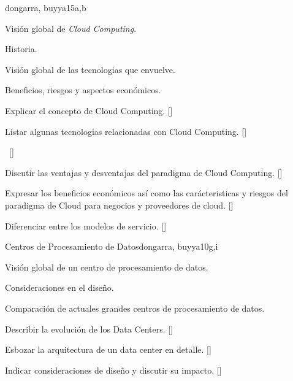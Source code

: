 \begin{syllabus}
\begin{unit}{\PDCloudComputing}{}{dongarra, buyya}{15}{a,b}
\begin{topics}
    \item Visión global de \textit{Cloud Computing}.
    \item Historia.
    \item Visión global de las tecnologias que envuelve.
    \item Beneficios, riesgos y aspectos económicos.
    \item \PDCloudComputingTopicCloud
    \item \PDCloudComputingTopicInternet
\end{topics}
\begin{learningoutcomes}
    \item Explicar el concepto de Cloud Computing. [\Familiarity]
    \item Listar algunas tecnologias relacionadas con Cloud Computing. [\Familiarity]
    \item \PDCloudComputingLOExplainStrategies~[\Familiarity] %
    \item Discutir las ventajas y desventajas del paradigma de Cloud Computing.  [\Familiarity]
    \item Expresar los beneficios económicos así­ como las carácteristicas y riesgos del paradigma de Cloud para negocios y proveedores de cloud.   [\Familiarity]
    \item Diferenciar entre los modelos de servicio.   [\Usage]
\end{learningoutcomes}
\end{unit}

\begin{unit}{Centros de Procesamiento de Datos}{}{dongarra, buyya}{10}{g,i}
\begin{topics}
    \item Visión global de un centro de procesamiento de datos.
    \item Consideraciones en el diseño.
    \item Comparación de actuales grandes centros de procesamiento de datos.
\end{topics}
\begin{learningoutcomes}
    \item Describir la evolución de los Data Centers. [\Familiarity]
    \item Esbozar la arquitectura de un data center en detalle. [\Familiarity]
    \item Indicar consideraciones de diseño y discutir su impacto.  [\Familiarity]
\end{learningoutcomes}
\end{unit}


\end{syllabus}
